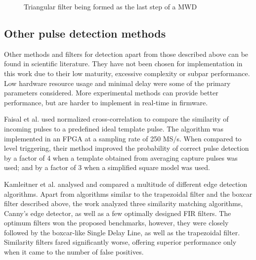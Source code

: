 \begin{figure}[H]

  \caption{Triangular filter being formed as the last step of a MWD}
  \label{fig:triangular_filter} 
\end{figure}

\subsection{Other pulse detection methods}

Other methods and filters for detection apart from those described above
can be found in scientific literature. They have not been chosen
for implementation in this work due to their low maturity,
excessive complexity or subpar performance. 
Low hardware resource usage and minimal delay
were some of the primary parameters considered.
More experimental methods can provide better performance,
but are harder to implement in real-time in firmware.


Faisal et al. used normalized cross-correlation to compare
the similarity of incoming pulses to a predefined ideal template pulse.
The algorithm was implemented in an FPGA at a sampling rate of 250 MS/s.
When compared to level triggering, 
their method improved the probability of correct pulse detection by a factor of 4
when a template obtained from averaging capture pulses was used;
and by a factor of 3 when a simplified square model was used.
\cite{detection_cross_correlation}


Kamleitner et al. analysed and compared a multitude
of different edge detection algorithms. 
Apart from algorithms similar to the trapezoidal filter and the boxcar
filter described above, the work analyzed three similarity matching algorithms,
Canny's edge detector, as well as a few optimally designed FIR filters.
The optimum filters won the proposed benchmarks, however, they were closely followed by
the boxcar-like Single Delay Line, as well as the trapezoidal filter.
Similarity filters fared significantly worse, offering superior performance
only when it came to the number of false positives.
\cite{pulse_processing_methods}

